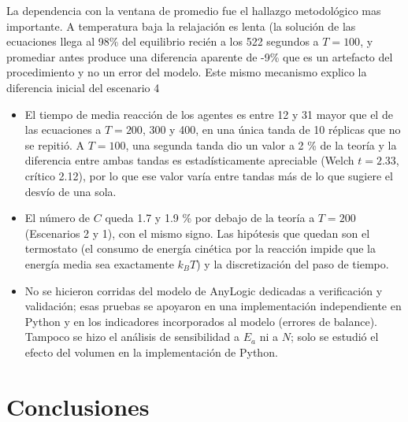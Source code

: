 \documentclass{article}
\begin{document}
La dependencia con la ventana de promedio fue el hallazgo metodológico mas importante. A temperatura baja la relajación es lenta (la solución de las ecuaciones llega al 98\% del equilibrio recién a los 522 segundos a $T=100$, y promediar antes produce una diferencia aparente de -9\% que es un artefacto del procedimiento y no un error del modelo. Este mismo mecanismo explico la diferencia inicial del escenario 4
\begin{itemize}
    \item El tiempo de media reacción de los agentes es entre 12 y 31 mayor que el de las ecuaciones a $T = 200$, 300 y 400, en una única tanda de 10 réplicas que no se repitió. A $T = 100$, una segunda tanda dio un valor a 2 \% de la teoría y la diferencia entre ambas tandas es estadísticamente apreciable (Welch $t = 2.33$, crítico 2.12), por lo que ese valor varía entre tandas más de lo que sugiere el desvío de una sola.
    \item El número de $C$ queda 1.7 y 1.9 \% por debajo de la teoría a $T = 200$ (Escenarios 2 y 1), con el mismo signo. Las hipótesis que quedan son el termostato (el consumo de energía cinética por la reacción impide que la energía media sea exactamente $k_BT$) y la discretización del paso de tiempo.
    \item No se hicieron corridas del modelo de AnyLogic dedicadas a verificación y validación; esas pruebas se apoyaron en una implementación independiente en Python y en los indicadores incorporados al modelo (errores de balance). Tampoco se hizo el análisis de sensibilidad a $E_a$ ni a $N$; solo se estudió el efecto del volumen en la implementación de Python.
\end{itemize}

\section{Conclusiones}
\end{document}

